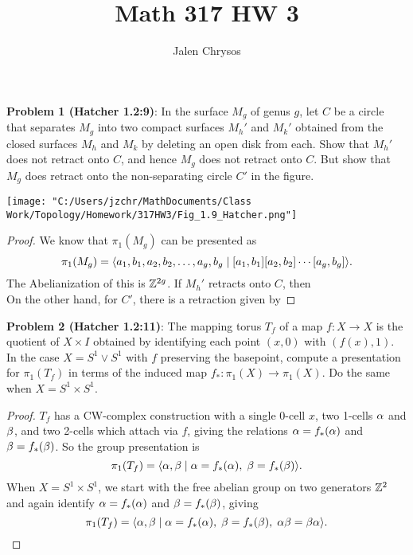 \documentclass{amsart}
\title{Math 317 HW 3}
\author{Jalen Chrysos}
\begin{document}
	\maketitle

\textbf{Problem 1 (Hatcher 1.2:9)}: In the surface $M_g$ of genus $g$, let $C$ be a circle that separates $M_g$ into two compact surfaces $M_h'$ and $M_k'$ obtained from the closed surfaces $M_h$ and $M_k$ by deleting an open disk from each. Show that $M_h'$ does not retract onto $C$, and hence $M_g$ does not retract onto $C$. But show that $M_g$ does retract onto the non-separating circle $C'$ in the figure.

\begin{center}
\texttt{[image: "C:/Users/jzchr/MathDocuments/Class Work/Topology/Homework/317HW3/Fig\_1.9\_Hatcher.png"]}
\end{center}

\begin{proof}
	We know that $\pi_1(M_g)$ can be presented as
	$$
	\pi_1(M_g) = \langle a_1,b_1,a_2,b_2,\dots,a_g,b_g \; | \; [a_1,b_1][a_2,b_2]\cdots [a_g,b_g]\rangle.
	$$
	The Abelianization of this is $\mathbb{Z}^{2g}$. If $M_h'$ retracts onto $C$, then \\
	
	On the other hand, for $C'$, there is a retraction given by 
\end{proof}

\newpage
\textbf{Problem 2 (Hatcher 1.2:11)}: The mapping torus $T_f$ of a map $f:X\to X$ is the quotient of $X\times I$ obtained by identifying each point $(x,0)$ with $(f(x),1)$. In the case $X=S^1\vee S^1$ with $f$ preserving the basepoint, compute a presentation for $\pi_1(T_f)$ in terms of the induced map $f_*:\pi_1(X)\to\pi_1(X)$. Do the same when $X=S^1\times S^1$.
\begin{proof}
	$T_f$ has a CW-complex construction with a single 0-cell $x$, two 1-cells $\alpha$ and $\beta$, and two 2-cells which attach via $f$, giving the relations $\alpha = f_*(\alpha)$ and $\beta=f_*(\beta)$. So the group presentation is 
	$$
	\pi_1(T_f) = \langle\alpha,\beta \; | \; \alpha = f_*(\alpha),\; \beta = f_*(\beta)\rangle.
	$$
	When $X=S^1\times S^1$, we start with the free abelian group on two generators $\mathbb{Z}^2$ and again identify $\alpha=f_*(\alpha)$ and $\beta=f_*(\beta)$, giving
	$$
	\pi_1(T_f) = \langle\alpha,\beta \; | \; \alpha = f_*(\alpha), \; \beta = f_*(\beta), \; \alpha\beta=\beta\alpha \rangle.
	$$
\end{proof}
\end{document}
